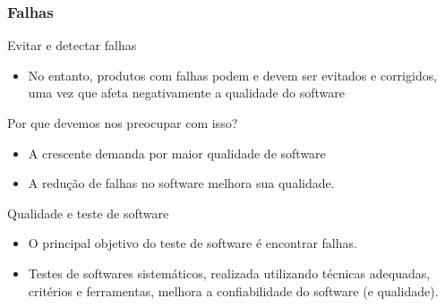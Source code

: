 \begin{frame}[hasprev=true, hasnext=false]
\frametitle{Falhas}

\begin{block:fact}{Evitar e detectar falhas}
\begin{itemize}
	\item No entanto, produtos com falhas podem e devem ser evitados e corrigidos, uma vez que afeta negativamente a qualidade do software
\end{itemize}
\end{block:fact}


\begin{block:fact}{Por que devemos nos preocupar com isso?}
\begin{itemize}
    \item A crescente demanda por maior qualidade de software

    \item A redução de falhas no software melhora sua qualidade.
\end{itemize}
\end{block:fact}

\begin{block:fact}{Qualidade e teste de software}
\begin{itemize}
	\item O principal objetivo do teste de software é encontrar falhas.

	\item Testes de softwares sistemáticos, realizada utilizando técnicas adequadas, critérios e ferramentas, melhora a confiabilidade do software (e qualidade).
\end{itemize}
\end{block:fact}
\end{frame}
